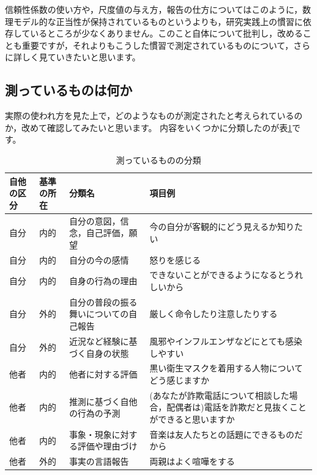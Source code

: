 \documentclass{ltjsbook}
\begin{document}
信頼性係数の使い方や，尺度値の与え方，報告の仕方についてはこのように，数理モデル的な正当性が保持されているものというよりも，研究実践上の慣習に依存しているところが少なくありません。このこと自体について批判し，改めることも重要ですが，それよりもこうした慣習で測定されているものについて，さらに詳しく見ていきたいと思います。

\subsection{測っているものは何か}
実際の使われ方を見た上で，どのようなものが測定されたと考えられているのか，改めて確認してみたいと思います。
内容をいくつかに分類したのが表\ref{ScaledObj}です。
\begin{table}
	\caption{測っているものの分類}
	\label{ScaledObj}
	\begin{tabular}{p{1cm}p{1cm}p{4cm}p{6cm}}
		自他の区分 & 基準の所在 & 分類名                 & 項目例                                             \\\hline
		自分    & 内的    & 自分の意図，信念，自己評価，願望    & 今の自分が客観的にどう見えるか知りたい                             \\
		自分    & 内的    & 自分の今の感情             & 怒りを感じる                                          \\
		自分    & 内的    & 自身の行為の理由            & できないことができるようになるとうれしいから                          \\
		自分    & 外的    & 自分の普段の振る舞いについての自己報告 & 厳しく命令したり注意したりする                                 \\
		自分    & 外的    & 近況など経験に基づく自身の状態     & 風邪やインフルエンザなどにとても感染しやすい                          \\
		他者    & 内的    & 他者に対する評価            & 黒い衛生マスクを着用する人物についてどう感じますか                       \\
		他者    & 内的    & 推測に基づく自他の行為の予測      & (あなたが詐欺電話について相談した場合，配偶者は)電話を詐欺だと見抜くことができると思いますか \\
		他者    & 内的    & 事象・現象に対する評価や理由づけ    & 音楽は友人たちとの話題にできるものだから                            \\
		他者    & 外的    & 事実の言語報告             & 両親はよく喧嘩をする                                      \\\hline
	\end{tabular}
\end{table}
\end{document}
